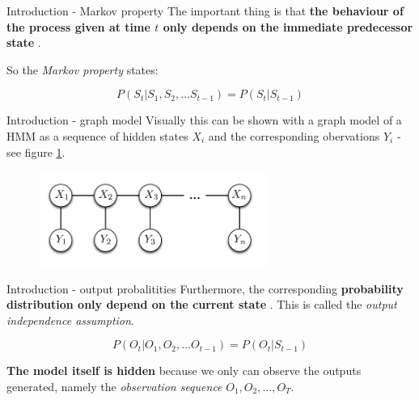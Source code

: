 \documentclass[11pt]{beamer}
\begin{document}
\begin{frame}{Introduction - Markov property}
The important thing is that \textbf{the behaviour of the process given at time $t$ only depends on the immediate predecessor state} .

So the \emph{Markov property} states:

\begin{equation}
	P(S_t | S_1,S_2, \ldots S_{t-1}) = P(S_t | S_{t-1})
\end{equation}

\end{frame}

\begin{frame}{Introduction - graph model}
Visually this can be shown with a graph model of a HMM as a sequence of hidden states $X_i$ and the corresponding obervations $Y_i$ - see figure \ref{fig:GraphModel}.

\begin{figure}[H]
	\centering
	
	\includegraphics[width=0.66\textwidth]{./Images/GraphModelHMM_1.png}
	\caption{ }
	\label{fig:GraphModel}
\end{figure}

\end{frame}

\begin{frame}{Introduction - output probalitities}
Furthermore, the corresponding \textbf{probability distribution only depend on the current state} . This is called the \emph{output independence assumption}.

\begin{equation}
P(O_t | O_1,O_2, \ldots O_{t-1}) = P(O_t | S_{t-1})
\end{equation}

\textbf{The model itself is hidden} because we only can observe the outputs generated, namely the \emph{observation sequence} $O_1, O_2, \ldots,  O_T$.
\end{frame}
\end{document}
